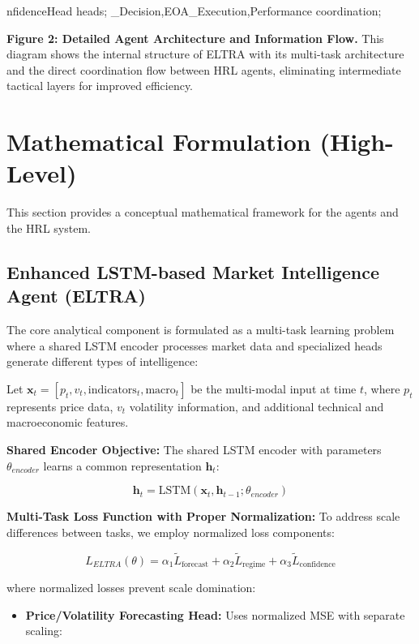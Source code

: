 \documentclass[11pt]{article}
\begin{document}
    nfidenceHead heads;
    \_Decision,EOA\_Execution,Performance coordination;

\textbf{Figure 2: Detailed Agent Architecture and Information Flow.} This diagram shows the internal structure of ELTRA with its multi-task architecture and the direct coordination flow between HRL agents, eliminating intermediate tactical layers for improved efficiency.

\section{Mathematical Formulation (High-Level)}

This section provides a conceptual mathematical framework for the agents and the HRL system.

\subsection{Enhanced LSTM-based Market Intelligence Agent (ELTRA)}

The core analytical component is formulated as a multi-task learning problem where a shared LSTM encoder processes market data and specialized heads generate different types of intelligence:

Let $\mathbf{x}_t = [p_t, v_t, \text{indicators}_t, \text{macro}_t]$ be the multi-modal input at time $t$, where $p_t$ represents price data, $v_t$ volatility information, and additional technical and macroeconomic features.

\textbf{Shared Encoder Objective:}
The shared LSTM encoder with parameters $\theta_{encoder}$ learns a common representation $\mathbf{h}_t$:

\begin{equation}
\mathbf{h}_t = \text{LSTM}(\mathbf{x}_t, \mathbf{h}_{t-1}; \theta_{encoder})
\end{equation}

\textbf{Multi-Task Loss Function with Proper Normalization:}
To address scale differences between tasks, we employ normalized loss components:

\begin{equation}
L_{ELTRA}(\theta) = \alpha_1 \tilde{L}_{\text{forecast}} + \alpha_2 \tilde{L}_{\text{regime}} + \alpha_3 \tilde{L}_{\text{confidence}}
\end{equation}

where normalized losses prevent scale domination:

\begin{itemize}
\item   \textbf{Price/Volatility Forecasting Head:} Uses normalized MSE with separate scaling:
\end{itemize}
   \1
\end{document}
